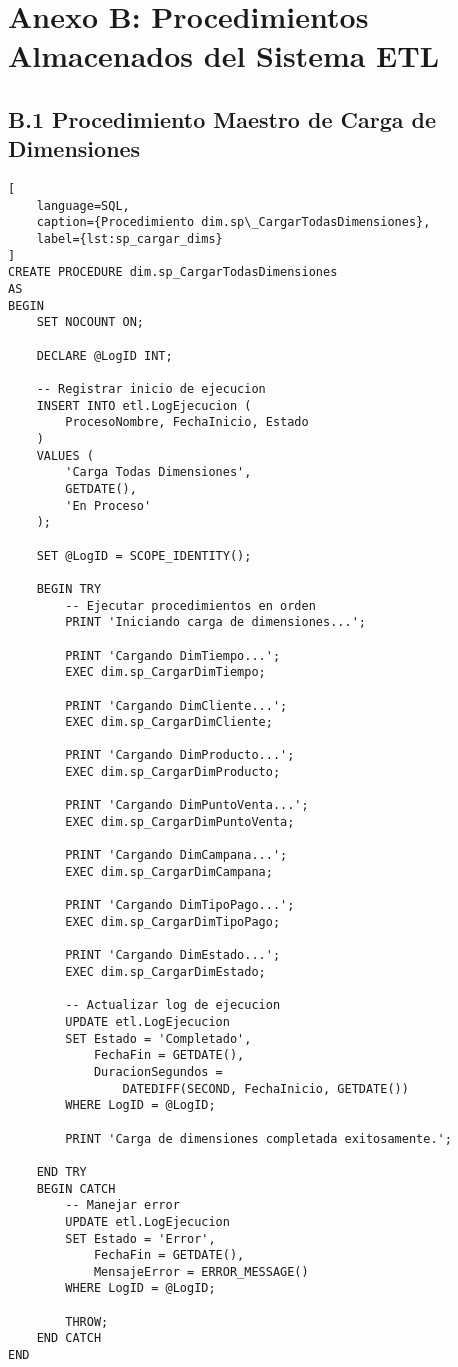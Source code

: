 \section{Anexo B: Procedimientos Almacenados del Sistema ETL}

\subsection{B.1 Procedimiento Maestro de Carga de Dimensiones}

\begin{lstlisting}[
    language=SQL,
    caption={Procedimiento dim.sp\_CargarTodasDimensiones},
    label={lst:sp_cargar_dims}
]
CREATE PROCEDURE dim.sp_CargarTodasDimensiones
AS
BEGIN
    SET NOCOUNT ON;
    
    DECLARE @LogID INT;
    
    -- Registrar inicio de ejecucion
    INSERT INTO etl.LogEjecucion (
        ProcesoNombre, FechaInicio, Estado
    )
    VALUES (
        'Carga Todas Dimensiones',
        GETDATE(),
        'En Proceso'
    );
    
    SET @LogID = SCOPE_IDENTITY();
    
    BEGIN TRY
        -- Ejecutar procedimientos en orden
        PRINT 'Iniciando carga de dimensiones...';
        
        PRINT 'Cargando DimTiempo...';
        EXEC dim.sp_CargarDimTiempo;
        
        PRINT 'Cargando DimCliente...';
        EXEC dim.sp_CargarDimCliente;
        
        PRINT 'Cargando DimProducto...';
        EXEC dim.sp_CargarDimProducto;
        
        PRINT 'Cargando DimPuntoVenta...';
        EXEC dim.sp_CargarDimPuntoVenta;
        
        PRINT 'Cargando DimCampana...';
        EXEC dim.sp_CargarDimCampana;
        
        PRINT 'Cargando DimTipoPago...';
        EXEC dim.sp_CargarDimTipoPago;
        
        PRINT 'Cargando DimEstado...';
        EXEC dim.sp_CargarDimEstado;
        
        -- Actualizar log de ejecucion
        UPDATE etl.LogEjecucion
        SET Estado = 'Completado',
            FechaFin = GETDATE(),
            DuracionSegundos = 
                DATEDIFF(SECOND, FechaInicio, GETDATE())
        WHERE LogID = @LogID;
        
        PRINT 'Carga de dimensiones completada exitosamente.';
        
    END TRY
    BEGIN CATCH
        -- Manejar error
        UPDATE etl.LogEjecucion
        SET Estado = 'Error',
            FechaFin = GETDATE(),
            MensajeError = ERROR_MESSAGE()
        WHERE LogID = @LogID;
        
        THROW;
    END CATCH
END
\end{lstlisting}

